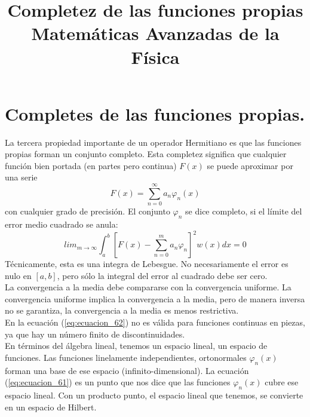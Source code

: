 
\usepackage{mathrsfs}
\title{Completez de las funciones propias \\ {\large Matemáticas Avanzadas de la Física}}
\date{ }

\renewcommand\labelenumii{\theenumi.{\arabic{enumii}}}
\maketitle
\fontsize{14}{14}\selectfont
\section{Completes de las funciones propias.}
La tercera propiedad importante de un operador Hermitiano es que las funciones propias forman un conjunto completo. Esta completez significa que cualquier función bien portada (en partes pero continua) $F(x)$ se puede aproximar por una serie
\begin{equation}
F(x) = \sum_{n=0}^{\infty} a_{n} \varphi_{n}(x) \label{eq:ecuacion_61}
\end{equation}
con cualquier grado de precisión. El conjunto $\varphi_{n}$ se dice completo, si el límite del error medio cuadrado se anula:
\begin{equation}
lim_{m \to \infty} \int_{a}^{b} \left[ F(x) - \sum_{n=0}^{m} a_{n} \varphi_{n} \right]^{2} w(x) dx = 0
\label{eq:ecuacion_62}
\end{equation}
Técnicamente, esta es una integra de Lebesgue. No necesariamente el error es nulo en $[a,b]$, pero sólo la integral del error al cuadrado debe ser cero.
\\
La convergencia a la media debe compararse con la convergencia uniforme. La convergencia uniforme implica la convergencia a la media, pero de manera inversa no se garantiza, la convergencia a la media es menos restrictiva.
\\
En la ecuación (\ref{eq:ecuacion_62}) no es válida para funciones continuas en piezas, ya que hay un número finito de discontinuidades.
\\
En términos del álgebra lineal, tenemos un espacio lineal, un espacio de funciones. Las funciones linelamente independientes, ortonormales $\varphi_{n}(x)$ forman una base de ese espacio (infinito-dimensional). La ecuación (\ref{eq:ecuacion_61}) es un punto que nos dice que las funciones $\varphi_{n}(x)$ cubre ese espacio lineal. Con un producto punto, el espacio lineal que tenemos, se convierte en un espacio de Hilbert.

